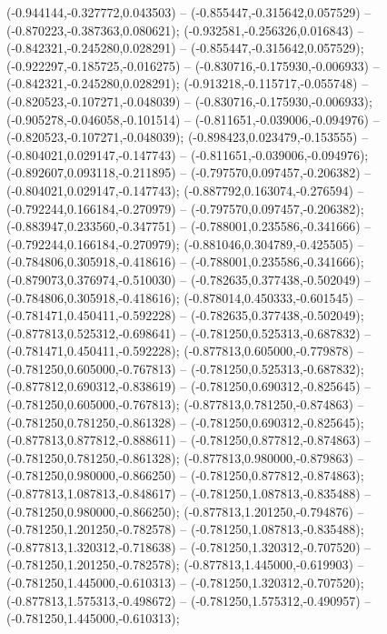  (-0.944144,-0.327772,0.043503) -- (-0.855447,-0.315642,0.057529) -- (-0.870223,-0.387363,0.080621);
 (-0.932581,-0.256326,0.016843) -- (-0.842321,-0.245280,0.028291) -- (-0.855447,-0.315642,0.057529);
 (-0.922297,-0.185725,-0.016275) -- (-0.830716,-0.175930,-0.006933) -- (-0.842321,-0.245280,0.028291);
 (-0.913218,-0.115717,-0.055748) -- (-0.820523,-0.107271,-0.048039) -- (-0.830716,-0.175930,-0.006933);
 (-0.905278,-0.046058,-0.101514) -- (-0.811651,-0.039006,-0.094976) -- (-0.820523,-0.107271,-0.048039);
 (-0.898423,0.023479,-0.153555) -- (-0.804021,0.029147,-0.147743) -- (-0.811651,-0.039006,-0.094976);
 (-0.892607,0.093118,-0.211895) -- (-0.797570,0.097457,-0.206382) -- (-0.804021,0.029147,-0.147743);
 (-0.887792,0.163074,-0.276594) -- (-0.792244,0.166184,-0.270979) -- (-0.797570,0.097457,-0.206382);
 (-0.883947,0.233560,-0.347751) -- (-0.788001,0.235586,-0.341666) -- (-0.792244,0.166184,-0.270979);
 (-0.881046,0.304789,-0.425505) -- (-0.784806,0.305918,-0.418616) -- (-0.788001,0.235586,-0.341666);
 (-0.879073,0.376974,-0.510030) -- (-0.782635,0.377438,-0.502049) -- (-0.784806,0.305918,-0.418616);
 (-0.878014,0.450333,-0.601545) -- (-0.781471,0.450411,-0.592228) -- (-0.782635,0.377438,-0.502049);
 (-0.877813,0.525312,-0.698641) -- (-0.781250,0.525313,-0.687832) -- (-0.781471,0.450411,-0.592228);
 (-0.877813,0.605000,-0.779878) -- (-0.781250,0.605000,-0.767813) -- (-0.781250,0.525313,-0.687832);
 (-0.877812,0.690312,-0.838619) -- (-0.781250,0.690312,-0.825645) -- (-0.781250,0.605000,-0.767813);
 (-0.877813,0.781250,-0.874863) -- (-0.781250,0.781250,-0.861328) -- (-0.781250,0.690312,-0.825645);
 (-0.877813,0.877812,-0.888611) -- (-0.781250,0.877812,-0.874863) -- (-0.781250,0.781250,-0.861328);
 (-0.877813,0.980000,-0.879863) -- (-0.781250,0.980000,-0.866250) -- (-0.781250,0.877812,-0.874863);
 (-0.877813,1.087813,-0.848617) -- (-0.781250,1.087813,-0.835488) -- (-0.781250,0.980000,-0.866250);
 (-0.877813,1.201250,-0.794876) -- (-0.781250,1.201250,-0.782578) -- (-0.781250,1.087813,-0.835488);
 (-0.877813,1.320312,-0.718638) -- (-0.781250,1.320312,-0.707520) -- (-0.781250,1.201250,-0.782578);
 (-0.877813,1.445000,-0.619903) -- (-0.781250,1.445000,-0.610313) -- (-0.781250,1.320312,-0.707520);
 (-0.877813,1.575313,-0.498672) -- (-0.781250,1.575312,-0.490957) -- (-0.781250,1.445000,-0.610313);
